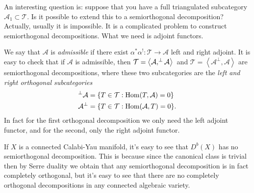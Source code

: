 An interesting question is: suppose that you
have a full triangulated subcategory
$\mathcal{A}_1 \subset \mathcal{T}$. Is it
possible to extend this to a semiorthogonal
decomposition? Actually, usually it is
impossible. It is a complicated problem to
construct semiorthogonal decompositions. What
we need is adjoint functors.

We say that $\mathcal{A}$ is {\it admissible}
if there exist $\alpha^*\alpha^!:\mathcal{T}
\to \mathcal{A}$ left and right adjoint. It
is easy to check that if $\mathcal{A}$ is
admissible, then
$\mathcal{T}=\left\langle{}\mathcal{A},
\leavevmode^\perp\mathcal{A}\right\rangle{}$
and
$\mathcal{T}=\left\langle{}\mathcal{A}^\perp,
\mathcal{A}\right\rangle{}$
are semiorthogonal decompositions, where
these two subcategories are the {\it left and
right orthogonal subcategories}
$$
\begin{aligned}
\leavevmode^\perp\mathcal{A}&=\{T \in
\mathcal{T}: \Hom(T,\mathcal{A})=0\}\\
\mathcal{A}^\perp&=\{T \in
\mathcal{T}:\Hom(\mathcal{A},T)=0\}.
\end{aligned}
$$
In fact for the first orthogonal
decomposition we only need the left adjoint
functor, and for the second, only the right
adjoint functor.

If $X$ is a connected Calabi-Yau manifold,
it's easy to see that $D^b(X)$ has no
semiorthogonal decomposition. This is because
since the canonical class is trivial then by
Serre duality we obtain that any
semiorthogonal decomposition is in fact
completely orthogonal, but it's easy to see
that there are no completely orthogonal
decompositions in any connected algebraic
variety.








